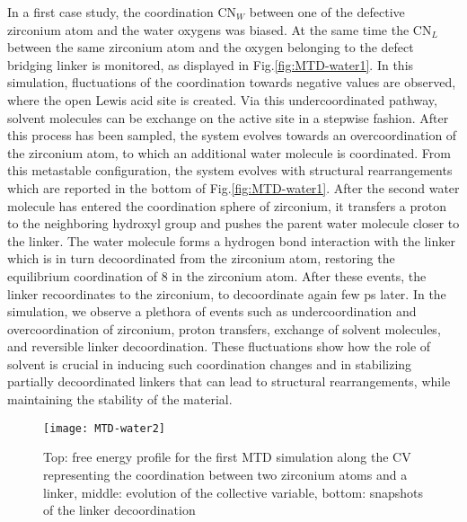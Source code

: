 In a first case study, the coordination CN$_W$ between one of the defective zirconium atom and the water oxygens was biased. At the same time the CN$_L$ between the same zirconium atom and the oxygen belonging to the defect bridging linker is monitored, as displayed in Fig.\ref{fig:MTD-water1}. In this simulation, fluctuations of the coordination towards negative values are observed, where the open Lewis acid site is created. Via this undercoordinated pathway, solvent molecules can be exchange on the active site in a stepwise fashion. After this process has been sampled, the system evolves towards an overcoordination of the zirconium atom, to which an additional water molecule is coordinated. From this metastable configuration, the system evolves with structural rearrangements which are reported in the bottom of Fig.\ref{fig:MTD-water1}. After the second water molecule has entered the coordination sphere of zirconium, it transfers a proton to the neighboring hydroxyl group and pushes the parent water molecule closer to the linker. The water molecule forms a hydrogen bond interaction with the linker which is in turn decoordinated from the zirconium atom, restoring the equilibrium coordination of 8 in the zirconium atom. After these events, the linker recoordinates to the zirconium, to decoordinate again few ps later. In the simulation, we observe a plethora of events such as undercoordination and overcoordination of zirconium, proton transfers, exchange of solvent molecules, and reversible linker decoordination. These fluctuations show how the role of solvent is crucial in inducing such coordination changes and in stabilizing partially decoordinated linkers that can lead to structural rearrangements, while maintaining the stability of the material. 
\npar
\begin{figure}[!htbp]
	\centering
	\texttt{[image: MTD-water2]}
	\caption{Top: free energy profile for the first MTD simulation along the CV representing the coordination between two zirconium atoms and a linker, middle: evolution of the collective variable, bottom: snapshots of the linker decoordination}
	\label{fig:MTD-water2}
\end{figure}
